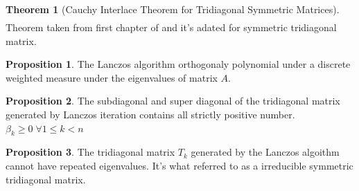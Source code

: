 \documentclass[]{article}
\theoremstyle{definition}
\newtheorem{theorem}{Theorem}            %
\newtheorem{prop}{Proposition}[section]  %
\begin{document}
\begin{appendices}
\begin{theorem}[Cauchy Interlace Theorem for Tridiagonal Symmetric Matrices]
\begin{align}
            \end{align}
            Theorem taken from first chapter of \cite{book:greenbaum} and it's adated for symmetric tridiagonal matrix. 
        \end{theorem}
        \begin{prop}
            The Lanczos algorithm orthogonaly polynomial under a discrete weighted measure under the eigenvalues of matrix $A$. 
        \end{prop}
        \begin{prop}
            The subdiagonal and super diagonal of the tridiagonal matrix generated by Lanczos iteration contains all strictly positive number. $\beta_k\ge 0\; \forall 1\le k < n$ 
        \end{prop}
        \begin{prop}
            The tridiagonal matrix $T_k$ generated by the Lanczos algoithm cannot have repeated eigenvalues. It's what referred to as a irreducible symmetric tridiagonal matrix. 
        \end{prop}
\end{appendices}
\newpage


\printbibliography
            
\end{document}
